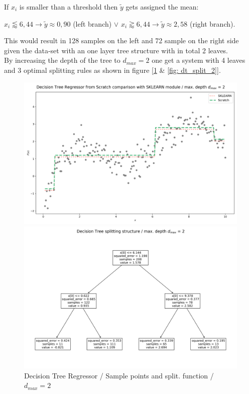 \documentclass[12pt, a4paper]{article}
\begin{document}
\newpage
If $x_i$ is smaller than a threshold then $\tilde{y}$ gets assigned the mean:
\begin{center}
    $x_i \lessapprox 6{,}44 \rightarrow \tilde{y} \approx 0{,}90$ (left branch) $\vee$ $x_i \gtrapprox 6{,}44 \rightarrow \tilde{y} \approx 2{,}58$ (right branch).
\end{center}
This would result in 128 samples on the left and 72 sample on the right side given the data-set with an one layer tree structure with in total 2 leaves. \\
By increasing the depth of the tree to $d_{max} = 2$ one get a system with 4 leaves and 3 optimal splitting rules as shown in figure [\ref{fig: dt_comp_2} \& \ref{fig: dt_split_2}].
\begin{figure}[htbp]
\begin{minipage}[t]{8cm}
\vspace{0pt}
\centering
\includegraphics[width=1\textwidth,trim={0 0 0 0},clip]{figures/decision_tree_regressor_comparison_md=2.png}
\caption[Decision Tree Regressor / Two Layers]{Decision Tree Regressor / Sample points and split. function / $d_{max} = 2$}
\label{fig: dt_comp_2}
\end{minipage}
\hfill
\begin{minipage}[t]{8cm}
\vspace{0pt}
\centering
\includegraphics[width=1\textwidth,trim={0 0 0 0},clip]{figures/decision_tree_splitting_structure_md=2.png}

\end{minipage}
\end{figure}
\end{document}
